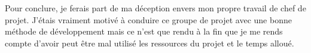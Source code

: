 \begin{description}
	Pour conclure, je ferais part de ma déception envers mon propre travail de chef de projet. J’étais vraiment motivé à conduire ce groupe de projet avec une bonne méthode de développement mais ce n’est que rendu à la fin que je me rends compte d’avoir peut être mal utilisé les ressources du projet et le temps alloué.

\end{description}
